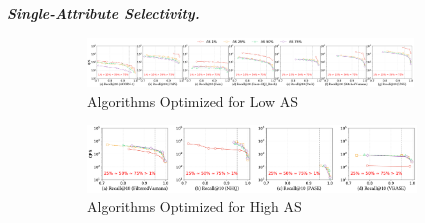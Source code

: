\documentclass[sigconf, nonacm]{acmart}
\begin{document}
{	\textit{\textbf{Single-Attribute Selectivity.}}
%	
%	
	
	
	
	
	\begin{figure}
		\centering
		
		\begin{subfigure}{\textwidth}
			\centering
			
			\includegraphics[width=0.95\textwidth]{figures/exp/exp_5_2_1.pdf}
			\caption{Algorithms Optimized for Low AS}
			\label{fig:exp_5_2_1}
		\end{subfigure}
		
		\vfill %
		
		\begin{subfigure}{0.627\textwidth} %
			\centering
			
			\includegraphics[width=0.96\textwidth]{figures/exp/exp_5_2_2.pdf}
			\caption{Algorithms Optimized for High AS}
			\label{fig:exp_5_2_2}
		\end{subfigure}
		\hspace{1mm} %
		\begin{subfigure}{0.33\textwidth} %
			\centering
			

\end{subfigure}
\end{figure}}
\end{document}
